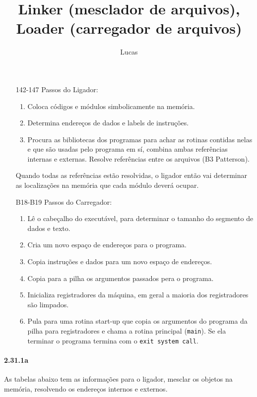 \documentclass{article}
\author{Lucas}
\title{Linker {\small(mesclador de arquivos)}, Loader {\small(carregador de 
arquivos)}}
\begin{document}
\maketitle

\begin{enumerate}

\item[142-147] Passos do Ligador: \begin{enumerate}
\item Coloca códigos e módulos simbolicamente na memória.
\item Determina endereços de dados e labels de instruções.
\item Procura as bibliotecas dos programas para achar as rotinas contidas nelas 
e que são usadas pelo programa em sí, combina ambas referências internas e 
externas. Resolve referências entre os arquivos (B3 Patterson).
\end{enumerate}

Quando todas as referências estão resolvidas, o ligador então vai determinar as 
localizações na memória que cada módulo deverá ocupar.

\item[B18-B19] Passos do Carregador: \begin{enumerate}
\item Lê o cabeçalho do executável, para determinar o tamanho do segmento de 
dados e texto.
\item Cria um novo espaço de endereços para o programa.
\item Copia instruções e dados para um novo espaço de endereços.
\item Copia para a pilha os argumentos passados pera o programa.
\item Inicializa registradores da máquina, em geral a maioria dos registradores
são limpados.
\item Pula para uma rotina start-up que copia os argumentos do programa da pilha
para registradores e chama a rotina principal (\verb|main|). Se ela terminar o
programa termina com o \verb|exit system call|.
\end{enumerate}

\end{enumerate}

\pagebreak
\paragraph{2.31.1a} As tabelas abaixo tem as informações para o ligador, mesclar
os objetos na memória, resolvendo os endereços internos e externos.
\end{document}
